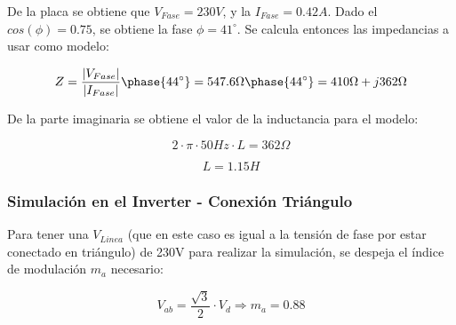 \documentclass[e4_tp3_main.tex]{subfiles}
\begin{document}
De la placa se obtiene que $V_{Fase} = 230V$, y la $I_{Fase} = 0.42A$. Dado el $cos(\phi) = 0.75$, se obtiene la fase $\phi = 41^{\circ}$. Se calcula entonces las impedancias a usar como modelo:

\[
Z = \frac{|V_{Fase}|}{|I_{Fase}|} \phase{44^{\circ}} = 547.6\Omega \phase{44^{\circ}} = 410 \Omega + j362 \Omega
\]  

De la parte imaginaria se obtiene el valor de la inductancia para el modelo:

\[
2 \cdot \pi \cdot 50Hz \cdot L = 362\Omega
\]

\[
L = 1.15H
\]

\subsubsection{Simulación en el Inverter - Conexión Triángulo}

Para tener una $V_{Linea}$ (que en este caso es igual a la tensión de fase por estar conectado en triángulo) de 230V para realizar la simulación, se despeja el índice de modulación $m_a$ necesario:

\[
V_{ab} = \frac{\sqrt{3}}{2} \cdot V_d \Longrightarrow m_a = 0.88
\]
\end{document}
